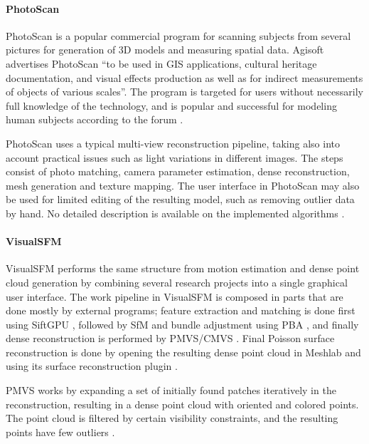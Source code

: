 \paragraph{PhotoScan}
PhotoScan \cite{photoscan} is a popular commercial program for scanning subjects from several pictures for generation of 3D models and measuring spatial data.
Agisoft advertises PhotoScan ``to be used in GIS applications, cultural heritage documentation, and visual effects production as well as for indirect measurements of objects of various scales''.
The program is targeted for users without necessarily full knowledge of the technology, and is popular and successful for modeling human subjects according to the forum \cite{agisoftforum}.

PhotoScan uses a typical multi-view reconstruction pipeline, taking also into account practical issues such as light variations in different images.
The steps consist of photo matching, camera parameter estimation, dense reconstruction, mesh generation and texture mapping.
The user interface in PhotoScan may also be used for limited editing of the resulting model, such as removing outlier data by hand.
No detailed description is available on the implemented algorithms \cite{photoscanalgorithms}.

\paragraph{VisualSFM}
VisualSFM \cite{wu2013towards} performs the same structure from motion estimation and dense point cloud generation by combining several research projects into a single graphical user interface.
The work pipeline in VisualSFM is composed in parts that are done mostly by external programs; feature extraction and matching is done first using SiftGPU \cite{changchang2007siftgpu}, followed by SfM and bundle adjustment using PBA \cite{wu2011multicore}, and finally dense reconstruction is performed by PMVS/CMVS \cite{furukawa2010accurate,furukawa2012patch}.
Final Poisson surface reconstruction is done by opening the resulting dense point cloud in Meshlab and using its surface reconstruction plugin \cite{meshlab}.

PMVS works by expanding a set of initially found patches iteratively in the reconstruction, resulting in a dense point cloud with oriented and colored points.
The point cloud is filtered by certain visibility constraints, and the resulting points have few outliers \cite{furukawa2012patch}.


